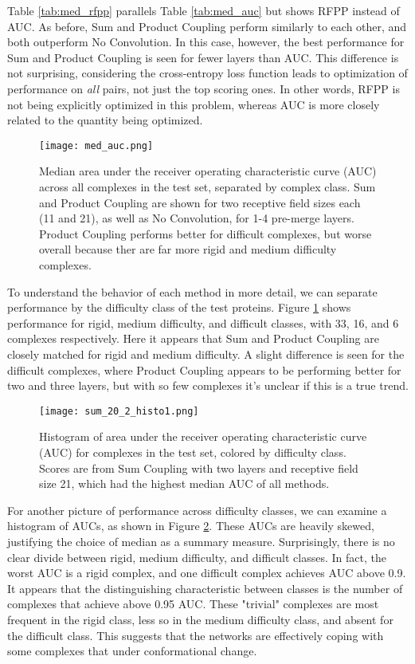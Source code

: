 Table \ref{tab:med_rfpp} parallels Table \ref{tab:med_auc} but shows RFPP instead of AUC.
As before, Sum and Product Coupling perform similarly to each other, and both outperform No Convolution.
In this case, however, the best performance for Sum and Product Coupling is seen for fewer layers than AUC.
This difference is not surprising, considering the cross-entropy loss function leads to optimization of performance on \emph{all} pairs, not just the top scoring ones.
In other words, RFPP is not being explicitly optimized in this problem, whereas AUC is more closely related to the quantity being optimized.

\begin{figure}
	\texttt{[image: med\_auc.png]}
	\caption{Median area under the receiver operating characteristic curve (AUC) across all complexes in the test set, separated by complex class. Sum and Product Coupling are shown for two receptive field sizes each (11 and 21), as well as No Convolution, for 1-4 pre-merge layers. Product Coupling performs better for difficult complexes, but worse overall because ther are far more rigid and medium difficulty complexes.
		\label{fig:med_auc}}
\end{figure}

To understand the behavior of each method in more detail, we can separate performance by the difficulty class of the test proteins.
Figure \ref{fig:med_auc} shows performance for rigid, medium difficulty, and difficult classes, with 33, 16, and 6 complexes respectively.
Here it appears that Sum and Product Coupling are closely matched for rigid and medium difficulty.
A slight difference is seen for the difficult complexes, where Product Coupling appears to be performing better for two and three layers, but with so few complexes it's unclear if this is a true trend.

\begin{figure}
	\texttt{[image: sum\_20\_2\_histo1.png]}
	\caption{Histogram of area under the receiver operating characteristic curve (AUC) for complexes in the test set, colored by difficulty class. Scores are from Sum Coupling with two layers and receptive field size 21, which had the highest median AUC of all methods.}
	\label{fig:histo1}
\end{figure}

For another picture of performance across difficulty classes, we can examine a histogram of AUCs, as shown in Figure \ref{fig:histo1}.
These AUCs are heavily skewed, justifying the choice of median as a summary measure.
Surprisingly, there is no clear divide between rigid, medium difficulty, and difficult classes.
In fact, the worst AUC is a rigid complex, and one difficult complex achieves AUC above 0.9.
It appears that the distinguishing characteristic between classes is the number of complexes that achieve above 0.95 AUC.
These "trivial" complexes are most frequent in the rigid class, less so in the medium difficulty class, and absent for the difficult class.
This suggests that the networks are effectively coping with some complexes that under conformational change.

